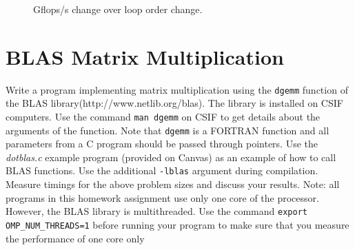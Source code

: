 \documentclass[12pt]{article}
\begin{document}
\begin{figure}[t]
  \centering
  \caption{Gflops/s change over loop order change.}
\end{figure}

\section{BLAS Matrix Multiplication}
Write a program implementing matrix multiplication using the  \lstinline$dgemm$ function of the BLAS library(http://www.netlib.org/blas). The library is installed on CSIF computers.  Use the command  \lstinline$man dgemm$ on CSIF to get details about the arguments of the function. Note that  \lstinline$dgemm$ is a FORTRAN function and all parameters from a C program should be passed through pointers. Use the \textit{dotblas.c} example program (provided on Canvas) as an example of how to call BLAS functions. Use the additional \lstinline$-lblas$ argument during compilation.
Measure timings for the above problem sizes and discuss your results.
Note: all programs in this homework assignment use only one core of the processor. However, the BLAS library is multithreaded.
Use the command \lstinline$export OMP_NUM_THREADS=1$ before running your program to make sure that you measure the performance of one core only
\end{document}
